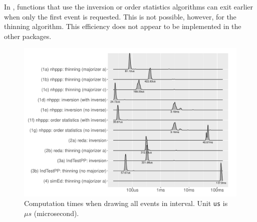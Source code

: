 \documentclass[article]{jss}\usepackage[]{graphicx}\usepackage[]{xcolor}
\makeatletter
\def\maxwidth{ %
  \ifdim\Gin@nat@width>\linewidth
    \linewidth
  \else
    \Gin@nat@width
  \fi
}
\newenvironment{knitrout}{}{} %
\makeatother
\begin{document}
In , functions that use the inversion or order statistics algorithms can exit earlier when only the first event is requested. This is not possible, however, for the thinning algorithm. This efficiency does not appear to be implemented in the other packages.






\begin{knitrout}
\color{fgcolor}\begin{figure}
\includegraphics[width=\maxwidth]{figure/comptimes_all_samples-1} \caption[Computation times when drawing all events in interval]{Computation times when drawing all events in interval. Unit \texttt{us} is $\mu s$ (microsecond).}\label{fig:comptimes_all_samples}
\end{figure}

\end{knitrout}
\end{document}
